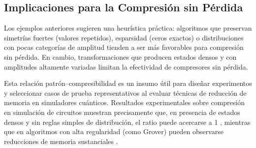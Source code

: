 \subsection{Implicaciones para la Compresión sin Pérdida}
\label{subsec:patrones_implicaciones}

Los ejemplos anteriores sugieren una heurística práctica: algoritmos que preservan simetrías fuertes (valores repetidos), esparsidad (ceros exactos) o distribuciones con pocas categorías de amplitud tienden a ser más favorables para compresión sin pérdida. En cambio, transformaciones que producen estados densos y con amplitudes altamente variadas limitan la efectividad de compresores sin pérdida.

Esta relación patrón--compresibilidad es un insumo útil para diseñar experimentos y seleccionar casos de prueba representativos al evaluar técnicas de reducción de memoria en simuladores cuánticos. Resultados experimentales sobre compresión en simulación de circuitos muestran precisamente que, en presencia de estados densos y sin reglas simples de distribución, el ratio puede acercarse a 1 \parencite{wu2018amplitude}, mientras que en algoritmos con alta regularidad (como Grover) pueden observarse reducciones de memoria sustanciales \parencite{wu2019full}.
